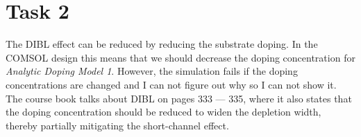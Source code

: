 \documentclass[12pt,a4paper]{article}
\begin{document}
\section{Task 2}
The DIBL effect can be reduced by reducing the substrate doping.
In the COMSOL design this means that we should decrease the doping concentration for \textit{Analytic Doping Model 1}.
However, the simulation fails if the doping concentrations are changed and I can not figure out why so I can not show it.
The course book talks about DIBL on pages 333 --- 335, where it also states that the doping concentration should be reduced to widen the depletion width, thereby partially mitigating the short-channel effect.
\end{document}
